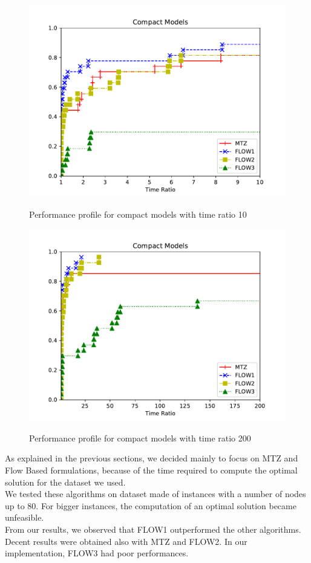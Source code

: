 \begin{figure}[H]
\centering
	\includegraphics[scale=0.9]{media/compact10.pdf} \\
	\caption{Performance profile for compact models with time ratio 10}
	\label{fig:compacts10}
\end{figure}

\begin{figure}[H]
\centering
	\includegraphics[scale=0.9]{media/compact200.pdf} \\
	\caption{Performance profile for compact models with time ratio 200}
	\label{fig:compacts200}
\end{figure}

As explained in the previous sections, we decided mainly to focus on MTZ and Flow Based formulations, because of the time required to compute the optimal solution for the dataset we used.\\
We tested these algorithms on dataset made of instances with a number of nodes up to 80. For bigger instances, the computation of an optimal solution became unfeasible.\\
From our results, we observed that FLOW1 outperformed the other algorithms. Decent results were obtained also with MTZ and FLOW2. In our implementation, FLOW3 had poor performances.

